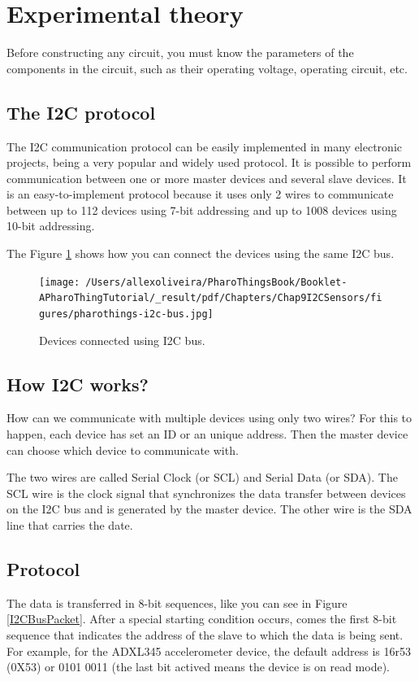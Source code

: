 \documentclass[10pt,twoside,english]{_support/latex/sbabook/sbabook}
\begin{document}
\section{Experimental theory}
Before constructing any circuit, you must know the parameters of the components in the circuit, such as their operating voltage, operating circuit, etc.
\subsection{The I2C protocol}
The I2C communication protocol can be easily implemented in many electronic projects, being a very popular and widely used protocol. It is possible to perform communication between one or more master devices and several slave devices. It is an easy-to-implement protocol because it uses only 2 wires to communicate between up to 112 devices using 7-bit addressing and up to 1008 devices using 10-bit addressing.

The Figure \ref{I2CBus} shows how you can connect the devices using the same I2C bus.


\begin{figure}

\begin{center}
\texttt{[image: /Users/allexoliveira/PharoThingsBook/Booklet-APharoThingTutorial/\_result/pdf/Chapters/Chap9I2CSensors/figures/pharothings-i2c-bus.jpg]}\caption{Devices connected using I2C bus.\label{I2CBus}}\end{center}
\end{figure}

\subsection{How I2C works?}
How can we communicate with multiple devices using only two wires? For this to happen, each device has set an ID or an unique address. Then the master device can choose which device to communicate with.

The two wires are called Serial Clock (or SCL) and Serial Data (or SDA). The SCL wire is the clock signal that synchronizes the data transfer between devices on the I2C bus and is generated by the master device. The other wire is the SDA line that carries the date.
\subsection{Protocol}
The data is transferred in 8-bit sequences, like you can see in Figure \ref{I2CBusPacket}. After a special starting condition occurs, comes the first 8-bit sequence that indicates the address of the slave to which the data is being sent.
For example, for the ADXL345 accelerometer device, the default address is 16r53 (0X53) or 0101 0011 (the last bit actived means the device is on read mode).
\end{document}
